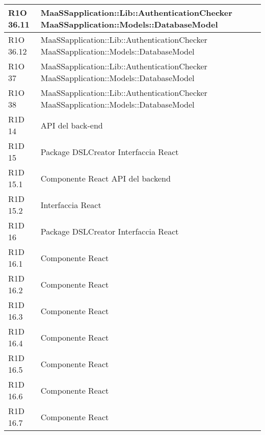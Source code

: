 \begin{center}
\begin{longtable}{ | l | p{8cm} |}
   	R1O 36.11 & MaaSSapplication::Lib::AuthenticationChecker \newline  MaaSSapplication::Models::DatabaseModel \\ \hline
   	
   	R1O 36.12 & MaaSSapplication::Lib::AuthenticationChecker \newline  MaaSSapplication::Models::DatabaseModel \\ \hline
   	
   	R1O 37 & MaaSSapplication::Lib::AuthenticationChecker \newline  MaaSSapplication::Models::DatabaseModel \\ \hline
   	
   	R1O 38 & MaaSSapplication::Lib::AuthenticationChecker \newline  MaaSSapplication::Models::DatabaseModel \\ \hline

	R1D 14 & API del back-end \\ \hline
	
	R1D 15 & Package DSLCreator \newline Interfaccia React \\ \hline

	R1D 15.1 & Componente React \newline API del backend \\ \hline

	R1D 15.2 & Interfaccia React \\ \hline

	R1D 16 & Package DSLCreator \newline Interfaccia React \\ \hline

	R1D 16.1 & Componente React \\ \hline

	R1D 16.2 & Componente React \\ \hline

	R1D 16.3 & Componente React \\ \hline	

	R1D 16.4 & Componente React \\ \hline

	R1D 16.5 & Componente React \\ \hline

	R1D 16.6 & Componente React \\ \hline

	R1D 16.7 & Componente React \\ \hline


\end{longtable}
\end{center}
